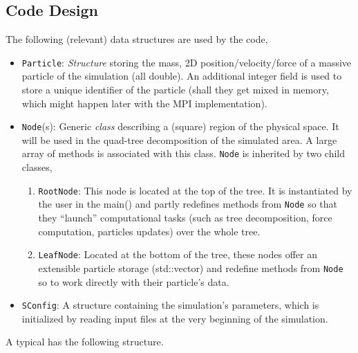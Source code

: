 \documentclass[10pt,a4paper]{scrartcl}
\begin{document}
	\subsection{Code Design} \label{sec:codedesign}
	The following (relevant) data structures are used by the code,
	\begin{itemize}
		\item \verb|Particle|: \emph{Structure} storing the mass, 2D position/velocity/force of a massive particle of the simulation (all double). An additional integer field is used to store a unique identifier of the particle (shall they get mixed in memory, which might happen later with the MPI implementation).
		\item \verb|Node|(s): Generic \emph{class} describing a (square) region of the physical space. It will be used in the quad-tree decomposition of the simulated area. A large array of methods is associated with this class. \verb|Node| is inherited by two child classes,
		\begin{enumerate}
			\item \verb|RootNode|: This node is located at the top of the tree. It is instantiated by the user in the main() and partly redefines methods from \verb|Node| so that they ``launch'' computational tasks (such as tree decomposition, force computation, particles updates) over the whole tree.
			\item \verb|LeafNode|: Located at the bottom of the tree, these nodes offer an extensible particle storage (std::vector) and redefine methods from \verb|Node| so to work directly with their particle's data.
		\end{enumerate}
		\item \verb|SConfig|: A structure containing the simulation's parameters, which is initialized by reading input files at the very beginning of the simulation.
	\end{itemize}
	A typical has the following structure.
\end{document}
